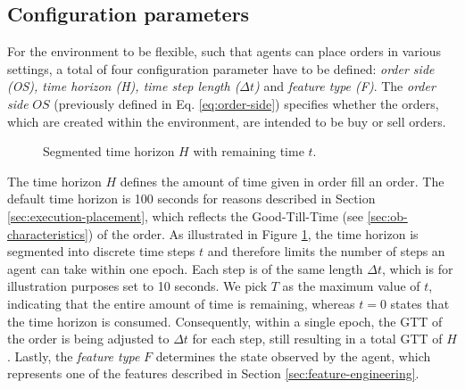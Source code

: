 \subsection{Configuration parameters}
For the environment to be flexible, such that agents can place orders in various settings, a total of four configuration parameter have to be defined: \textit{order side (OS), time horizon (H), time step length ($\Delta{t}$)} and \textit{feature type (F)}.
The \textit{order side} $OS$ (previously defined in Eq. \ref{eq:order-side}) specifies whether the orders, which are created within the environment, are intended to be buy or sell orders.
\begin{figure}[H]
    \centering
    \caption{Segmented time horizon $H$ with remaining time $t$.}
    \label{fig:setup-time-horizon}
\end{figure}
The time horizon $H$ defines the amount of time given in order fill an order.
The default time horizon is 100 seconds for reasons described in Section \ref{sec:execution-placement}, which reflects the Good-Till-Time (see \ref{sec:ob-characteristics}) of the order.
As illustrated in Figure \ref{fig:setup-time-horizon}, the time horizon is segmented into discrete time steps $t$ and therefore limits the number of steps an agent can take within one epoch.
Each step is of the same length $\Delta{t}$, which is for illustration purposes set to 10 seconds.
We pick $T$ as the maximum value of $t$, indicating that the entire amount of time is remaining, whereas $t=0$ states that the time horizon is consumed.
Consequently, within a single epoch, the GTT of the order is being adjusted to $\Delta{t}$ for each step, still resulting in a total GTT of $H$.
Lastly, the \textit{feature type } $F$ determines the state observed by the agent, which represents one of the features described in Section \ref{sec:feature-engineering}.

